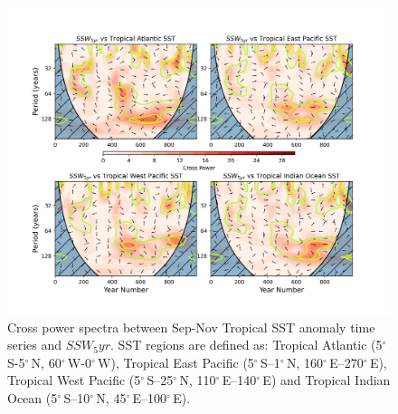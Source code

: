 \documentclass[wcd, manuscript]{copernicus}
\providecommand{\DIFaddbeginFL}{} %
\providecommand{\DIFaddendFL}{} %
\providecommand{\DIFdelbeginFL}{} %
\providecommand{\DIFdelendFL}{} %
\begin{document}
\begin{center}
\begin{figure}[h!]
\noindent\DIFdelbeginFL %
\DIFdelendFL \DIFaddbeginFL \includegraphics[width = \linewidth]{new_changed_figures/SSW_5yr_vs_trop_SSTs_crosspower_new_levels.png}
\DIFaddendFL \caption{Cross power spectra between Sep-Nov Tropical SST anomaly time series and $SSW_5yr$. SST regions are defined as: Tropical Atlantic (5$^{\circ}$\,S-5$^{\circ}$\,N, 60$^{\circ}$\,W-0$^{\circ}$\,W), Tropical East Pacific (5$^{\circ}$\,S–1${^\circ}$\,N, 160$^{\circ}$\,E–270$^{\circ}$\,E), Tropical West Pacific (5$^{\circ}$\,S–25$^{\circ}$\,N, 110$^{\circ}$\,E–140$^{\circ}$\,E) and Tropical Indian Ocean (5$^{\circ}$\,S–10$^{\circ}$\,N, 45$^{\circ}$\,E–100$^{\circ}$\,E).}
\label{fig3}
\end{figure}
\end{center}
\end{document}
